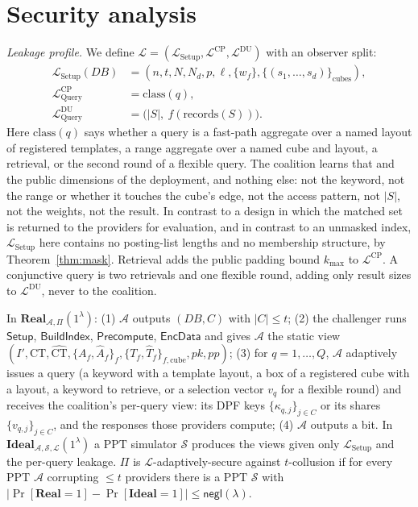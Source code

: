 \documentclass[a4paper,fleqn]{cas-sc}
\newcommand{\negl}{\mathsf{negl}}
\newcommand{\PPT}{\mathrm{PPT}}
\newcommand{\Real}{\mathbf{Real}}
\newcommand{\Ideal}{\mathbf{Ideal}}
\newcommand{\Leak}{\mathcal{L}}
\newcommand{\Sim}{\mathcal{S}}
\newcommand{\Adv}{\mathcal{A}}
\begin{document}
\section{Security analysis}
\label{sec:security}

\emph{Leakage profile.} We define
$\Leak=(\Leak_{\mathrm{Setup}},\Leak^{\text{CP}},\Leak^{\text{DU}})$ with an
observer split:
\begin{align*}
\Leak_{\mathrm{Setup}}(DB) &= (n,t,N,N_d,p,\ell,\{w_f\},\{(s_1,\dots,s_d)\}_{\text{cubes}}),\\
\Leak^{\text{CP}}_{\mathrm{Query}} &= \mathrm{class}(q),\\
\Leak^{\text{DU}}_{\mathrm{Query}} &= \big(|S|,\ f(\mathrm{records}(S))\big).
\end{align*}
Here $\mathrm{class}(q)$ says whether a query is a fast-path aggregate over a
named layout of registered templates, a range aggregate over a named cube and
layout, a retrieval, or the second round of a flexible query. The coalition
learns that and the public dimensions of the deployment, and nothing else: not
the keyword, not the range or whether it touches the cube's edge, not the
access pattern, not $|S|$, not the weights, not the result. In contrast to a design in which
the matched set is returned to the providers for evaluation, and in contrast
to an unmasked index, $\Leak_{\mathrm{Setup}}$ here contains no posting-list
lengths and no membership structure, by Theorem~\ref{thm:mask}. Retrieval adds
the public padding bound $k_{\max}$ to $\Leak^{\text{CP}}$. A conjunctive
query is two retrievals and one flexible round, adding only result sizes to
$\Leak^{\text{DU}}$, never to the coalition.

\begin{definition}[$\Leak$-security against $t$-collusion]
\label{def:sec}
In $\Real_{\Adv,\Pi}(1^\lambda)$: (1) $\Adv$ outputs $(DB,C)$ with $|C|\le t$;
(2) the challenger runs $\mathsf{Setup}$, $\mathsf{BuildIndex}$,
$\mathsf{Precompute}$, $\mathsf{EncData}$ and gives $\Adv$ the static view
$(I',\text{CT},\widehat{\text{CT}},\{A_f,\widehat A_f\}_f,\{T_f,\widehat
T_f\}_{f,\text{cube}},pk,pp)$;
(3) for $q=1,\dots,Q$, $\Adv$ adaptively issues a query (a keyword with a
template layout, a box of a registered cube with a layout, a keyword to
retrieve, or a selection vector $v_q$ for a flexible round) and receives the coalition's per-query view: its DPF keys
$\{\kappa_{q,j}\}_{j\in C}$ or its shares $\{v_{q,j}\}_{j\in C}$, and the
responses those providers compute; (4) $\Adv$
outputs a bit. In $\Ideal_{\Adv,\Sim,\Leak}(1^\lambda)$ a $\PPT$ simulator
$\Sim$ produces the views given only $\Leak_{\mathrm{Setup}}$ and the
per-query leakage. $\Pi$ is $\Leak$-adaptively-secure against $t$-collusion if
for every $\PPT$ $\Adv$ corrupting $\le t$ providers there is a $\PPT$ $\Sim$
with $|\Pr[\Real=1]-\Pr[\Ideal=1]|\le\negl(\lambda)$.
\end{definition}
\end{document}
